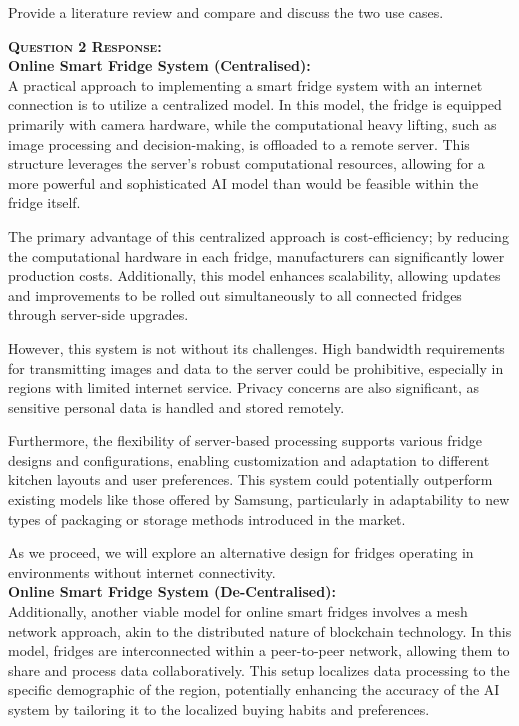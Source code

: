 \documentclass[runningheads]{llncs}
\newcommand{\SubSec}[1]{\vspace{1em}\noindent\textsc{\textbf{#1}}\vspace{0.5em} \\} %
\begin{document}
\noindent Provide a literature review and compare and discuss the two use cases.

\SubSec{Question 2 Response:}

\noindent\textbf{Online Smart Fridge System (Centralised):} \\
A practical approach to implementing a smart fridge system with an internet connection is to utilize a centralized model. In this model, the fridge is equipped primarily with camera hardware, while the computational heavy lifting, such as image processing and decision-making, is offloaded to a remote server. This structure leverages the server's robust computational resources, allowing for a more powerful and sophisticated AI model than would be feasible within the fridge itself.

The primary advantage of this centralized approach is cost-efficiency; by reducing the computational hardware in each fridge, manufacturers can significantly lower production costs. Additionally, this model enhances scalability, allowing updates and improvements to be rolled out simultaneously to all connected fridges through server-side upgrades.

However, this system is not without its challenges. High bandwidth requirements for transmitting images and data to the server could be prohibitive, especially in regions with limited internet service. Privacy concerns are also significant, as sensitive personal data is handled and stored remotely.

Furthermore, the flexibility of server-based processing supports various fridge designs and configurations, enabling customization and adaptation to different kitchen layouts and user preferences. This system could potentially outperform existing models like those offered by Samsung, particularly in adaptability to new types of packaging or storage methods introduced in the market.

As we proceed, we will explore an alternative design for fridges operating in environments without internet connectivity. \\

\noindent\textbf{Online Smart Fridge System (De-Centralised):} \\
Additionally, another viable model for online smart fridges involves a mesh network approach, akin to the distributed nature of blockchain technology. In this model, fridges are interconnected within a peer-to-peer network, allowing them to share and process data collaboratively. This setup localizes data processing to the specific demographic of the region, potentially enhancing the accuracy of the AI system by tailoring it to the localized buying habits and preferences.
\end{document}
